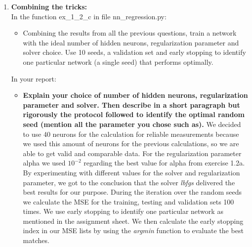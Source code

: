 \documentclass[a4paper]{article}
\begin{document}
\begin{enumerate}[label=(\alph*)]
\item \textbf{Combining the tricks:}\\
In the function ex\_1\_2\_c in file nn\_regression.py:
\begin{itemize}
\item Combining the results from all the previous questions, train a network with the ideal number of hidden neurons, regularization parameter and solver choice. Use 10 seeds, a validation set and early stopping to identify one particular network (a single seed) that performs optimally.
\end{itemize}
In your report:
\begin{itemize}
\item \textbf{Explain your choice of number of hidden neurons, regularization parameter and solver. Then describe in a short paragraph but rigorously the protocol followed to identify the optimal random seed (mention all the parameter you chose such as).}
\newline \newline
We decided to use 40 neurons for the calculation for reliable measurements because we used this amount of neurons for the previous calculations, so we are able to get valid and comparable data.
For the regularization parameter alpha we used \textit{$10^{-2}$} regarding the best value for alpha from exercise 1.2a.
By experimenting with different values for the solver and regularization parameter, we got to the conclusion that the solver \textit{lbfgs} delivered the best results for our purpose.
\newline \newline
During the iteration over the random seeds we calculate the MSE for the training, testing and validation sets 100 times.
We use early stopping to identify one particular network as mentioned in the assignment sheet. We then calculate the early stopping index in our MSE lists by using the \textit{argmin} function to evaluate the best matches.


\end{itemize}
\end{enumerate}
\end{document}
